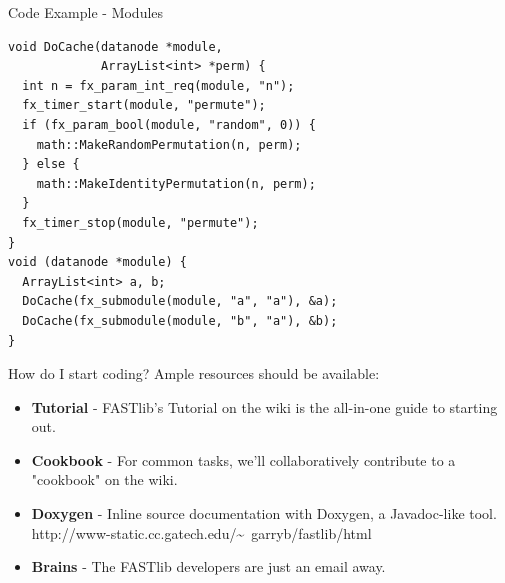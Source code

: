 \documentclass[pdf,colorBG,slideColor]{prosper}
\newcommand{\itemt}[1]{\item {\bf #1} -}
\begin{document}
\begin{slide}{Code Example - Modules}
\vspace{-.17in}
\begin{verbatim}
void DoCache(datanode *module,
             ArrayList<int> *perm) {
  int n = fx_param_int_req(module, "n");
  fx_timer_start(module, "permute");
  if (fx_param_bool(module, "random", 0)) {
    math::MakeRandomPermutation(n, perm);
  } else {
    math::MakeIdentityPermutation(n, perm);
  }
  fx_timer_stop(module, "permute");
}
void (datanode *module) {
  ArrayList<int> a, b;
  DoCache(fx_submodule(module, "a", "a"), &a);
  DoCache(fx_submodule(module, "b", "a"), &b);
}
\end{verbatim}
\end{slide}

%

\begin{slide}{How do I start coding?}
 \vspace*{.3in}
 Ample resources should be available: \\
 \begin{itemize}
 \itemt{Tutorial} FASTlib's Tutorial on the wiki is the all-in-one guide to starting out.
 \itemt{Cookbook}
 For common tasks, we'll collaboratively contribute to a "cookbook" on the wiki.
 \itemt{Doxygen}
 Inline source documentation with Doxygen, a Javadoc-like tool.
 http://www-static.cc.gatech.edu/\~~garryb/fastlib/html
 \itemt{Brains}
 The FASTlib developers are just an email away.
 \end{itemize}
\end{slide}
\end{document}
